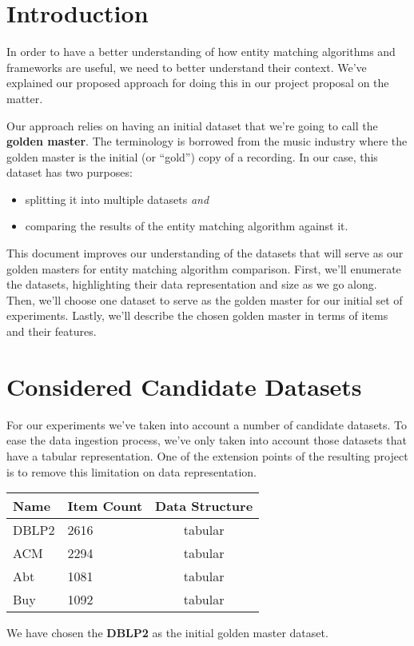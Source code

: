 \documentclass[a4paper,12pt]{article}
\begin{document}
\section{Introduction}
\begin{FlushLeft}
    In order to have a better understanding of how entity matching algorithms and frameworks
    are useful, we need to better understand their context. We've explained our proposed
    approach for doing this in our project proposal on the matter.
\end{FlushLeft}
\begin{FlushLeft}
    Our approach relies on having an initial dataset that we're going to call the
    \textbf{golden master}. The terminology is borrowed from the music industry
    where the golden master is the initial (or ``gold'') copy of a recording. In our case,
    this dataset has two purposes:
    \begin{itemize}
        \item splitting it into multiple datasets \textit{and}
        \item comparing the results of the entity matching algorithm against it.
    \end{itemize}
\end{FlushLeft}
\begin{FlushLeft}
    This document improves our understanding of the datasets that will serve as
    our golden masters for entity matching algorithm comparison. First, we'll 
    enumerate the datasets, highlighting their data representation and size as
    we go along. Then, we'll choose one dataset to serve as the golden master
    for our initial set of experiments. Lastly, we'll describe the chosen golden
    master in terms of items and their features.
\end{FlushLeft}
\section{Considered Candidate Datasets}
For our experiments we've taken into account a number of candidate
datasets. To ease the data ingestion process, we've only taken into account
those datasets that have a tabular representation. One of the extension
points of the resulting project is to remove this limitation on data
representation.
\begin{center}
\begin{tabular}{llc}
    \toprule
    Name & Item Count & Data Structure \\
    \midrule
    DBLP2 & 2616 & tabular \\
    ACM & 2294 & tabular \\
    Abt & 1081 & tabular \\
    Buy & 1092 & tabular \\
    \bottomrule
\end{tabular}
\end{center}
\begin{FlushLeft}
    We have chosen the \textbf{DBLP2} as the initial golden master dataset.
\end{FlushLeft}
\end{document}
